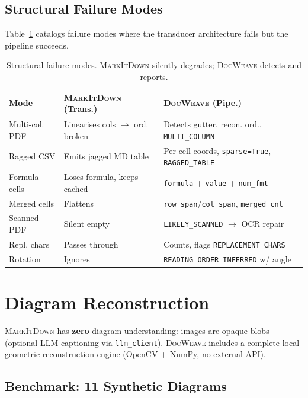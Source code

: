 \documentclass[10pt, conference, compsocconf]{IEEEtran}
\theoremstyle{plain}
\newcommand{\docweave}{\textsc{DocWeave}}
\newcommand{\markitdown}{\textsc{MarkItDown}}
\begin{document}
\subsection{Structural Failure Modes}

Table~\ref{tab:failure-modes} catalogs failure modes where the transducer architecture fails but the pipeline succeeds.

\begin{table}[t]
\centering
\caption{Structural failure modes. \markitdown{} silently degrades; \docweave{} detects and reports.}
\label{tab:failure-modes}
\footnotesize
\begin{tabular*}{\textwidth}{@{\extracolsep{\fill}}p{}p{}p{}@{}}
\toprule
\textbf{Mode} & \textbf{\markitdown{} (Trans.)} & \textbf{\docweave{} (Pipe.)} \\
\midrule
Multi-col. PDF & Linearises cols $\to$ ord. broken & Detects gutter, recon. ord., \texttt{MULTI\_COLUMN} \\
Ragged CSV & Emits jagged MD table & Per-cell coords, \texttt{sparse=True}, \texttt{RAGGED\_TABLE} \\
Formula cells & Loses formula, keeps cached & \texttt{formula} + \texttt{value} + \texttt{num\_fmt} \\
Merged cells & Flattens & \texttt{row\_span}/\texttt{col\_span}, \texttt{merged\_cnt} \\
Scanned PDF & Silent empty & \texttt{LIKELY\_SCANNED} $\to$ OCR repair \\
Repl. chars & Passes through & Counts, flags \texttt{REPLACEMENT\_CHARS} \\
Rotation & Ignores & \texttt{READING\_ORDER\_INFERRED} w/ angle \\
\bottomrule
\end{tabular*}
\end{table}

\section{Diagram Reconstruction}
\label{sec:diagrams}

\markitdown{} has \textbf{zero} diagram understanding: images are opaque blobs (optional LLM captioning via \texttt{llm\_client}). \docweave{} includes a complete local geometric reconstruction engine (OpenCV + NumPy, no external API).

\subsection{Benchmark: 11 Synthetic Diagrams}
\end{document}
